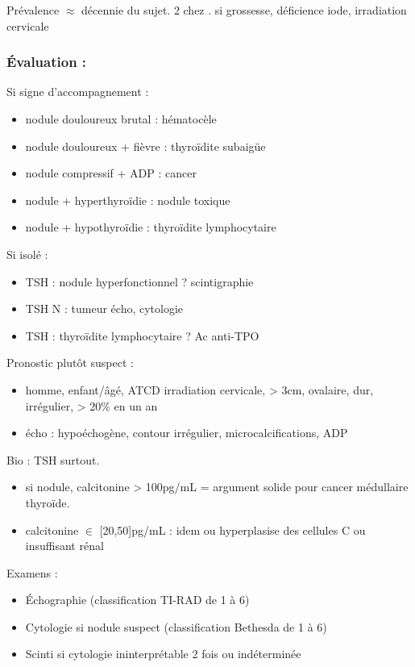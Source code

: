 \documentclass{book}
\begin{document}
Prévalence \(\approx\) décennie du sujet. \texttimes{} 2 chez \female. \inc si grossesse,
déficience iode, irradiation cervicale

\subsubsection{Évaluation :}
\label{sec:org7d499de}
Si signe d'accompagnement :
\begin{itemize}
\item nodule douloureux brutal : hématocèle
\item nodule douloureux + fièvre : thyroïdite subaigüe
\item nodule compressif + ADP : cancer
\item nodule + hyperthyroïdie : nodule toxique
\item nodule + hypothyroïdie : thyroïdite lymphocytaire
\end{itemize}
Si isolé : 
\begin{itemize}
\item TSH \dec : nodule hyperfonctionnel ? \thus scintigraphie
\item TSH N : tumeur \thus écho, cytologie
\item TSH \inc : thyroïdite lymphocytaire ? \thus Ac anti-TPO
\end{itemize}

Pronostic plutôt suspect : 
\begin{itemize}
\item homme, enfant/âgé, ATCD irradiation cervicale, > 3cm, ovalaire, dur, irrégulier, > 20\% en un an
\item écho : hypoéchogène, contour irrégulier, microcalcifications, ADP
\end{itemize}

Bio : TSH surtout. 
\begin{itemize}
\item si nodule, calcitonine > 100pg/mL = argument solide pour cancer médullaire thyroïde.
\item calcitonine \(\in\) [20,50]pg/mL : idem ou hyperplasise des cellules C ou insuffisant rénal
\end{itemize}

Examens : 
\begin{itemize}
\item Échographie (classification TI-RAD de 1 à 6)
\item Cytologie si nodule suspect (classification Bethesda de 1 à 6)
\item Scinti si cytologie ininterprétable 2 fois ou indéterminée
\end{itemize}
\end{document}
